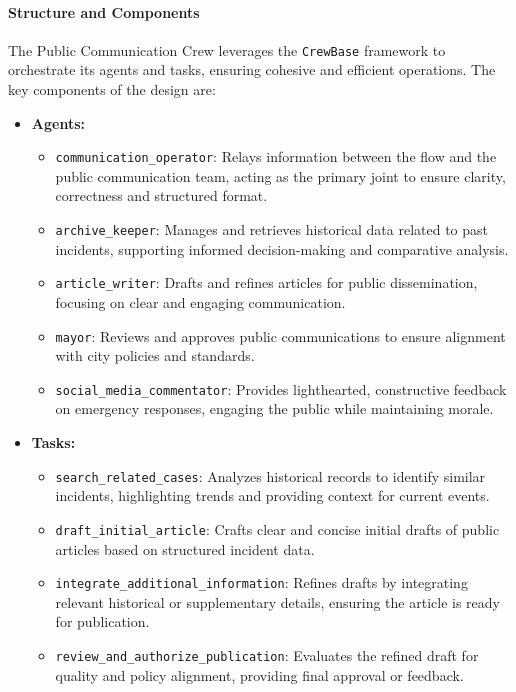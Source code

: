 \paragraph{Structure and Components}
The Public Communication Crew leverages the \texttt{CrewBase} framework to orchestrate its agents and tasks, ensuring cohesive and efficient operations. The key components of the design are:

\begin{itemize}
    \item \textbf{Agents:}
    \begin{itemize}
        \item \texttt{communication\_operator}: Relays information between the flow and the public communication team, acting as the primary joint to ensure clarity, correctness and structured format.
        \item \texttt{archive\_keeper}: Manages and retrieves historical data related to past incidents, supporting informed decision-making and comparative analysis.
        \item \texttt{article\_writer}: Drafts and refines articles for public dissemination, focusing on clear and engaging communication.
        \item \texttt{mayor}: Reviews and approves public communications to ensure alignment with city policies and standards.
        \item \texttt{social\_media\_commentator}: Provides lighthearted, constructive feedback on emergency responses, engaging the public while maintaining morale.
    \end{itemize}
    \item \textbf{Tasks:}
    \begin{itemize}
        \item \texttt{search\_related\_cases}: Analyzes historical records to identify similar incidents, highlighting trends and providing context for current events.
        \item \texttt{draft\_initial\_article}: Crafts clear and concise initial drafts of public articles based on structured incident data.
        \item \texttt{integrate\_additional\_information}: Refines drafts by integrating relevant historical or supplementary details, ensuring the article is ready for publication.
        \item \texttt{review\_and\_authorize\_publication}: Evaluates the refined draft for quality and policy alignment, providing final approval or feedback.

\end{itemize}
\end{itemize}
